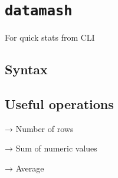    
    
    

    
    \section{\texorpdfstring{\texttt{datamash}}{datamash}}\label{datamash}

For quick stats from CLI

    \subsection{Syntax}\label{syntax}

\begin{Shaded}
\begin{Highlighting}[]
 \PreprocessorTok{[}\PreprocessorTok{]}
\end{Highlighting}
\end{Shaded}

    \subsection{Useful operations}\label{useful-operations}

\begin{Shaded}
\begin{Highlighting}[]
\end{Highlighting}
\end{Shaded}

→ Number of rows

\begin{Shaded}
\begin{Highlighting}[]
\end{Highlighting}
\end{Shaded}

→ Sum of numeric values

\begin{Shaded}
\begin{Highlighting}[]
\end{Highlighting}
\end{Shaded}

→ Average

\begin{Shaded}
\begin{Highlighting}[]
\end{Highlighting}
\end{Shaded}

